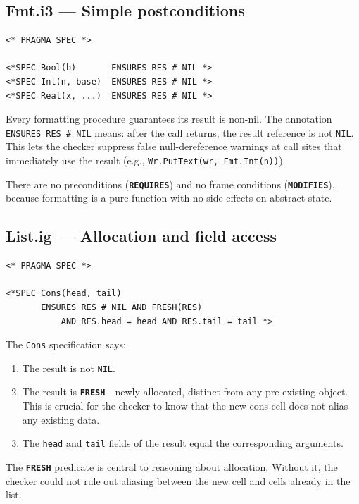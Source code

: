 \documentclass[11pt]{article}
\newcommand{\m}[1]{\texttt{#1}}
\newcommand{\kw}[1]{\texttt{\textbf{#1}}}
\begin{document}
\subsection{Fmt.i3 --- Simple postconditions}
\label{sec:fmt}

\begin{lstlisting}[language=ESC]
<* PRAGMA SPEC *>

<*SPEC Bool(b)       ENSURES RES # NIL *>
<*SPEC Int(n, base)  ENSURES RES # NIL *>
<*SPEC Real(x, ...)  ENSURES RES # NIL *>
\end{lstlisting}

Every formatting procedure guarantees its result is non-nil.  The
annotation \m{ENSURES RES \# NIL} means: after the call returns, the
result reference is not \m{NIL}.  This lets the checker suppress
false null-dereference warnings at call sites that immediately use the
result (e.g., \m{Wr.PutText(wr, Fmt.Int(n))}).

There are no preconditions (\kw{REQUIRES}) and no frame conditions
(\kw{MODIFIES}), because formatting is a pure function with no
side effects on abstract state.

\subsection{List.ig --- Allocation and field access}
\label{sec:list}

\begin{lstlisting}[language=ESC]
<* PRAGMA SPEC *>

<*SPEC Cons(head, tail)
       ENSURES RES # NIL AND FRESH(RES)
           AND RES.head = head AND RES.tail = tail *>
\end{lstlisting}

The \m{Cons} specification says:
\begin{enumerate}[nosep]
  \item The result is not \m{NIL}.
  \item The result is \kw{FRESH}---newly allocated, distinct from any
    pre-existing object.  This is crucial for the checker to know that
    the new cons cell does not alias any existing data.
  \item The \m{head} and \m{tail} fields of the result equal the
    corresponding arguments.
\end{enumerate}

The \kw{FRESH} predicate is central to reasoning about allocation.
Without it, the checker could not rule out aliasing between the new
cell and cells already in the list.
\end{document}
